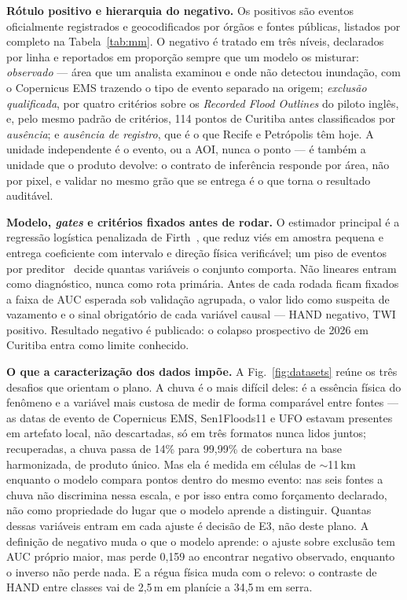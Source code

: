 \documentclass[conference]{IEEEtran}
\begin{document}
\textbf{Rótulo positivo e hierarquia do negativo.} Os positivos são eventos
oficialmente registrados e geocodificados por órgãos e fontes públicas,
listados por completo na Tabela~\ref{tab:mm}. O
negativo é tratado em três níveis, declarados por linha e reportados em proporção
sempre que um modelo os misturar: \emph{observado} --- área que um analista
examinou e onde não detectou inundação, com o Copernicus EMS trazendo o tipo de
evento separado na origem; \emph{exclusão qualificada}, por quatro critérios
sobre os \emph{Recorded Flood Outlines} do piloto inglês, e, pelo mesmo
padrão de critérios, 114 pontos de Curitiba antes classificados por
\emph{ausência}; e \emph{ausência de registro}, que é o que Recife e
Petrópolis têm hoje. A unidade
independente é o evento, ou a AOI, nunca o ponto --- é também a unidade que o
produto devolve: o contrato de inferência responde por área, não por pixel, e
validar no mesmo grão que se entrega é o que torna o resultado auditável.

\textbf{Modelo, \emph{gates} e critérios fixados antes de rodar.} O estimador
principal é a regressão logística penalizada de Firth~\cite{firth1993}, que reduz
viés em amostra pequena e entrega coeficiente com intervalo e direção física
verificável; um piso de eventos por preditor~\cite{peduzzi1996} decide quantas
variáveis o conjunto comporta. Não lineares entram como diagnóstico, nunca como
rota primária. Antes de cada rodada ficam fixados a faixa de AUC esperada sob
validação agrupada, o valor lido como suspeita de vazamento e o sinal obrigatório
de cada variável causal --- HAND negativo, TWI positivo. Resultado negativo é
publicado: o colapso prospectivo de 2026 em Curitiba entra como limite
conhecido.

\textbf{O que a caracterização dos dados impõe.} A Fig.~\ref{fig:datasets} reúne
os três desafios que orientam o plano. A chuva é o mais difícil deles: é a
essência física do fenômeno e a variável mais custosa de medir de forma
comparável entre fontes --- as datas de evento de Copernicus EMS,
Sen1Floods11 e UFO estavam presentes em artefato local, não descartadas, só
em três formatos nunca lidos juntos; recuperadas, a chuva passa de 14\% para
99,99\% de cobertura na base harmonizada, de produto único. Mas ela é medida em
células de $\sim$11\,km enquanto o modelo compara pontos dentro do mesmo
evento: nas seis fontes a chuva não discrimina nessa escala, e por isso entra
como forçamento declarado, não como propriedade do lugar que o modelo aprende
a distinguir. Quantas dessas variáveis entram em cada ajuste é decisão de E3,
não deste plano. A definição de negativo muda o
que o modelo aprende: o
ajuste sobre exclusão tem AUC próprio maior, mas perde 0,159 ao encontrar
negativo observado, enquanto o inverso não perde nada. E a régua física muda com
o relevo: o contraste de HAND entre classes vai de 2,5\,m em planície a
34,5\,m em serra.
\end{document}
